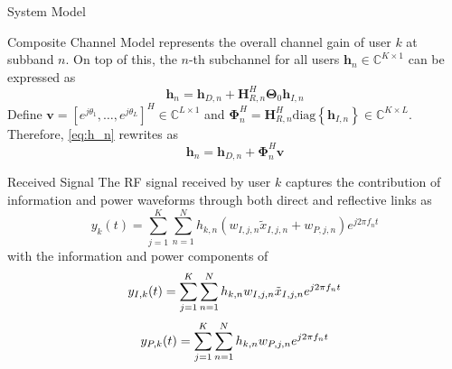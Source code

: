 \documentclass{IEEEtran}
\begin{document}
\begin{section}{System Model}
\begin{subsection}{Composite Channel Model}
		represents the overall channel gain of user $k$ at subband $n$. On top of this, the $n$-th subchannel for all users $\boldsymbol{h}_n \in \mathbb{C}^{K \times 1}$ can be expressed as
		\begin{equation}\label{eq:h_n}
			\boldsymbol{h}_n=\boldsymbol{h}_{D,n}+\boldsymbol{H}_{R,n}^H\boldsymbol{\Theta}_0\boldsymbol{h}_{I,n}
		\end{equation}
		Define $\boldsymbol{v}=[e^{j{\theta_1}},\dots,e^{j{\theta_L}}]^H \in \mathbb{C}^{L \times 1}$ and $\boldsymbol{\Phi}_n^H=\boldsymbol{H}_{R,n}^H\mathrm{diag}\left\{\boldsymbol{h}_{I,n}\right\} \in \mathbb{C}^{K \times L}$. Therefore, \ref{eq:h_n} rewrites as
		\begin{equation}
			\boldsymbol{h}_n=\boldsymbol{h}_{D,n}+\boldsymbol{\Phi}_n^H\boldsymbol{v}
		\end{equation}
	\end{subsection}

	\begin{subsection}{Received Signal}
		The RF signal received by user $k$ captures the contribution of information and power waveforms through both direct and reflective links as
		\begin{equation}\label{eq:y_k(t)}
			y_k(t)=\sum_{j=1}^K\sum_{n=1}^N{h_{k,n}}(w_{I,j,n}\tilde{x}_{I,j,n}+w_{P,j,n}){e^{j2{\pi}{f_n}{t}}}
		\end{equation}
		with the information and power components of
		\begin{equation}\label{eq:y_{I,k}(t)}
			y_{I,k}(t)=\sum_{j=1}^K\sum_{n=1}^N{h_{k,n}w_{I,j,n}\tilde{x}_{I,j,n}}{e^{j2{\pi}{f_n}{t}}}
		\end{equation}
		\begin{equation}\label{eq:y_{P,k}(t)}
			y_{P,k}(t)=\sum_{j=1}^K\sum_{n=1}^N{h_{k,n}w_{P,j,n}}{e^{j2{\pi}{f_n}{t}}}
		\end{equation}

	\end{subsection}


\end{section}
\end{document}
